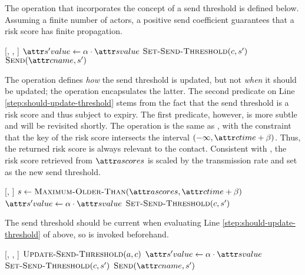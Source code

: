 The \cApplyRiskScore operation that incorporates the concept of a send threshold is defined below. Assuming a finite number of actors, a positive send coefficient guarantees that a risk score has finite propagation.

\begin{function}{\nApplyRiskScore}[\vActor, \vContact, \vScore]
  \If{$\aContactThresholdValue < \aScoreValue \AND \aContactTime + \pTimeBuffer > \aScoreTime$}
    \State $\aNewScoreValue \assign \pTransmissionRate \cdot \aScoreValue$
    \State $\cSetSendThreshold[\vContact, \vNewScore]$
    \State $\cSend[\aContactName, \vNewScore]$
  \EndIf
\end{function}

The \cSetSendThreshold operation defines \emph{how} the send threshold is updated, but not \emph{when} it should be updated; the \cUpdateSendThreshold operation encapsulates the latter. The second predicate on Line \ref{step:should-update-threshold} stems from the fact that the send threshold is a risk score and thus subject to expiry. The first predicate, however, is more subtle and will be revisited shortly. The \cMaximumOlderThan operation is the same as \cMaximum, with the constraint that the key of the risk score intersects the interval $(-\infty, \aContactTime + \pTimeBuffer)$. Thus, the returned risk score is always relevant to the contact. Consistent with \cApplyRiskScore, the risk score retrieved from $\aActorScores$ is scaled by the transmission rate and set as the new send threshold.

\begin{function}{\nUpdateSendThreshold}[\vActor, \vContact]
   \label{step:should-update-threshold}
    \State $\vScore \assign \cMaximumOlderThan[\aActorScores, \aContactTime + \pTimeBuffer]$ \label{step:get-max-older-than}
    \State $\aNewScoreValue \assign \pTransmissionRate \cdot \aScoreValue$
    \State $\cSetSendThreshold[\vContact, \vNewScore]$
  \EndIf
\end{function}

The send threshold should be current when evaluating Line \ref{step:should-update-threshold} of \cApplyRiskScore above, so \cUpdateSendThreshold is invoked beforehand.

\begin{function}{\nApplyRiskScore}[\vActor, \vContact, \vScore]
  \State $\cUpdateSendThreshold[\vActor, \vContact]$
  \If{$\aContactThresholdValue < \aScoreValue \AND \aContactTime + \pTimeBuffer > \aScoreTime$}
    \State $\aNewScoreValue \assign \pTransmissionRate \cdot \aScoreValue$
    \State $\cSetSendThreshold[\vContact, \vNewScore]$
    \State $\cSend[\aContactName, \vNewScore]$
  \EndIf
\end{function}

